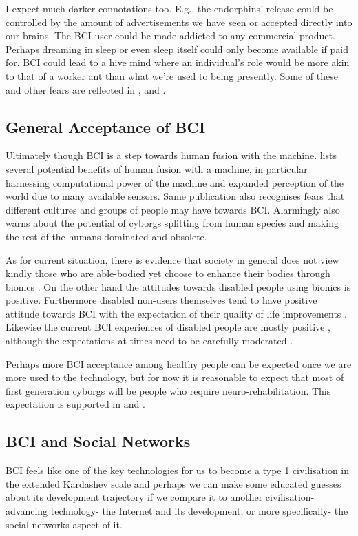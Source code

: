 \documentclass[fleqn,11pt]{olplainarticle}
\begin{document}
I expect much darker connotations too. E.g., the endorphins' release could be controlled by the amount of advertisements we have seen or accepted directly into our brains. The BCI user could be made addicted to any commercial product. Perhaps dreaming in sleep or even sleep itself could only become available if paid for. BCI could lead to a hive mind where an individual's role would be more akin to that of a worker ant than what we're used to being presently. Some of these and other fears are reflected in \cite{liberatore_2021}, \cite{kogel2019using} and \cite{warwick2003cyborg}.

\subsection{General Acceptance of BCI}
Ultimately though BCI is a step towards human fusion with the machine. \cite{warwick2003cyborg} lists several potential benefits of human fusion with a machine, in particular harnessing computational power of the machine and expanded perception of the world due to many available sensors. Same publication also recognises fears that different cultures and groups of people may have towards BCI. Alarmingly \cite{warwick2003cyborg} also warns about the potential of cyborgs splitting from human species and making the rest of the humans dominated and obsolete.

As for current situation, there is evidence that society in general does not view kindly those who are able-bodied yet choose to enhance their bodies through bionics \cite {meyer2018disabled}. On the other hand the attitudes towards disabled people using bionics is positive. Furthermore disabled non-users themselves tend to have positive attitude towards BCI with the expectation of their quality of life improvements \cite{kogel2019using}. Likewise the current BCI experiences of disabled people are mostly positive \cite{kogel2020like}, although the expectations at times need to be carefully moderated \cite{glannon2014ethical}.

Perhaps more BCI acceptance among healthy people can be expected once we are more used to the technology, but for now it is reasonable to expect that most of first generation cyborgs will be people who require neuro-rehabilitation. This expectation is supported in \cite{schalk2008brain} and \cite{kogel2019using}.

\subsection{BCI and Social Networks}
BCI feels like one of the key technologies for us to become a type 1 civilisation in the extended Kardashev scale \cite{gray2020extended} and perhaps we can make some educated guesses about its development trajectory if we compare it to another civilisation-advancing technology- the Internet and its development, or more specifically- the social networks aspect of it.
\end{document}
